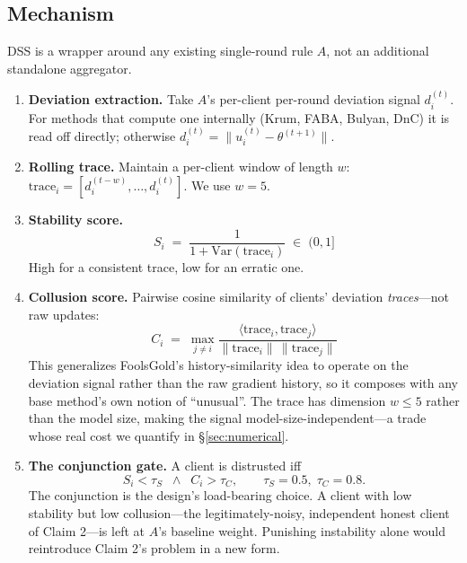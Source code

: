 \documentclass[11pt,a4paper]{article}
\begin{document}
\subsection{Mechanism}
\label{sec:mechanism}

DSS is a wrapper around any existing single-round rule $A$, not an
additional standalone aggregator.

\begin{enumerate}
  \item \textbf{Deviation extraction.} Take $A$'s per-client per-round
    deviation signal $d_i^{(t)}$. For methods that compute one internally
    (Krum, FABA, Bulyan, DnC) it is read off directly; otherwise
    $d_i^{(t)} = \lVert u_i^{(t)} - \theta^{(t+1)} \rVert$.

  \item \textbf{Rolling trace.} Maintain a per-client window of length
    $w$: $\mathrm{trace}_i = [d_i^{(t-w)}, \dots, d_i^{(t)}]$. We use
    $w = 5$.

  \item \textbf{Stability score.}
    \begin{equation}
      S_i \;=\; \frac{1}{1 + \mathrm{Var}(\mathrm{trace}_i)}
      \;\in\; (0, 1]
    \end{equation}
    High for a consistent trace, low for an erratic one.

  \item \textbf{Collusion score.} Pairwise cosine similarity of clients'
    deviation \emph{traces}---not raw updates:
    \begin{equation}
      C_i \;=\; \max_{j \neq i}
        \frac{\langle \mathrm{trace}_i, \mathrm{trace}_j \rangle}
             {\lVert \mathrm{trace}_i \rVert \, \lVert \mathrm{trace}_j \rVert}
    \end{equation}
    This generalizes FoolsGold's history-similarity idea to operate on the
    deviation signal rather than the raw gradient history, so it composes
    with any base method's own notion of ``unusual''. The trace has
    dimension $w \leq 5$ rather than the model size, making the signal
    model-size-independent---a trade whose real cost we quantify in
    \S\ref{sec:numerical}.

  \item \textbf{The conjunction gate.} A client is distrusted iff
    \begin{equation}
      S_i < \tau_S \;\;\wedge\;\; C_i > \tau_C,
      \qquad \tau_S = 0.5,\; \tau_C = 0.8.
      \label{eq:gate}
    \end{equation}
    The conjunction is the design's load-bearing choice. A client with low
    stability but low collusion---the legitimately-noisy, independent
    honest client of Claim 2---is left at $A$'s baseline weight. Punishing
    instability alone would reintroduce Claim 2's problem in a new form.


\end{enumerate}
\end{document}

